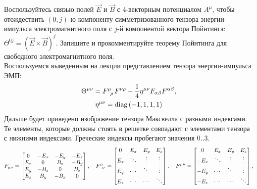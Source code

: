 \documentclass[__main__.tex]{subfiles}
\begin{document}
Воспользуйтесь связью полей $\vec{E}$ и $\vec{B}$ с 4-векторным потенциалом $A^\mu$, чтобы отождествить $(0,j)$-ю компоненту симметризованного тензора энергии-импульса электромагнитного поля с $j$-й компонентой вектора Пойнтинга: $\Theta^{0j}=\left(\vec{E}\times\vec{B}\right)^{j}$. Запишите и прокомментируйте теорему Пойнтинга для свободного электромагнитного поля.\\

Воспользуемся выведенным на лекции представлением тензора энергии-импульса ЭМП:
\begin{gather*}
    \Theta^{\mu\nu} = F\indices{^\mu_\rho}F^{\nu\rho}-\frac{1}{4}\eta^{\mu\nu}F_{\alpha\beta}F^{\alpha\beta},\\
    \eta^{\mu\nu}=\operatorname{diag}\left(-1,1,1,1\right)
\end{gather*}
Дальше будет приведено изображение тензора Максвелла с разными индексами. Те элементы, которые должны стоять в решетке совпадают с элементами тензора с нижними индексами. Греческие индексы пробегают значения $0{..}3$.
\begin{gather}
    F_{\mu\nu}
    =
    \left[
        \begin{matrix}
            0   & -E_x & -E_y & -E_z \\
            E_x & 0    & B_z  & -B_y \\
            E_y & -B_z & 0    & B_x  \\
            E_z & B_y  & -B_x & 0    \\
        \end{matrix}
        \right],
    \quad
    F\indices{^\mu_\nu}
    =
    \left[
        \begin{matrix}
            0   & E_x    & E_y    & E_z    \\
            E_x & \ddots & \vdots & \vdots \\
            E_y & \cdots & \ddots & \vdots \\
            E_z & \cdots & \cdots & \ddots \\
        \end{matrix}
        \right],
    \quad
    F^{\mu\nu}
    =
    \left[
        \begin{matrix}
            0    & E_x    & E_y    & E_z    \\
            -E_x & \ddots & \vdots & \vdots \\
            -E_y & \cdots & \ddots & \vdots \\
            -E_z & \cdots & \cdots & \ddots \\
        \end{matrix}
        \right],
\end{gather}
\end{document}
